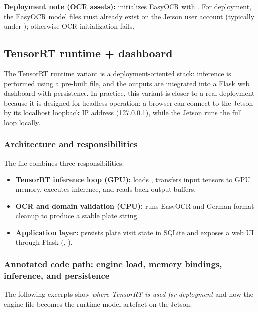 \noindent
\textbf{Deployment note (OCR assets):}  initializes EasyOCR with .
For deployment, the EasyOCR model files must already exist on the Jetson user account (typically under ); otherwise OCR initialization fails.

\subsection{TensorRT runtime + dashboard}
\label{sec:deployment_tensorrt_runtime_dashboard}

\noindent
The TensorRT runtime variant is a deployment-oriented stack: inference is performed using a pre-built  file, and the outputs are integrated into a Flask web dashboard with persistence.
In practice, this variant is closer to a real deployment because it is designed for headless operation: a browser can connect to the Jetson by its localhost loopback IP address (127.0.0.1), while the Jetson runs the full loop locally.

\subsubsection*{Architecture and responsibilities}
\noindent
The file  combines three responsibilities:
\begin{itemize}
	\item \textbf{TensorRT inference loop (GPU):} loads , transfers input tensors to GPU memory, executes inference, and reads back output buffers.
	\item \textbf{OCR and domain validation (CPU):} runs EasyOCR and German-format cleanup to produce a stable plate string.
	\item \textbf{Application layer:} persists plate visit state in SQLite and exposes a web UI through Flask (, ).
\end{itemize}

\subsubsection*{Annotated code path: engine load, memory bindings, inference, and persistence}
\noindent
The following excerpts show \emph{where TensorRT is used for deployment} and how the engine file becomes the runtime model artefact on the Jetson:

